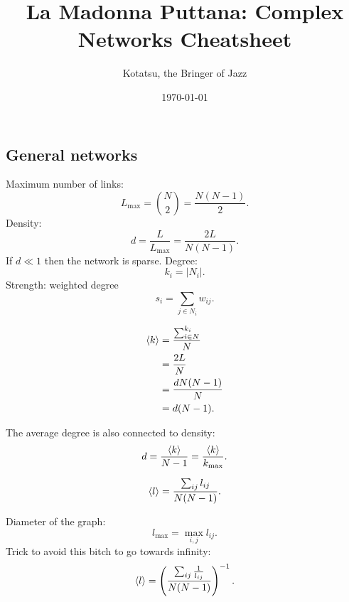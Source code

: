 \documentclass[a4paper,9pt]{extarticle}
\title{La Madonna Puttana: Complex Networks Cheatsheet}
\author{\usym{1F3BC}\;Kotatsu, the Bringer of Jazz\;\usym{1F3B9}}
\date{\today}
\begin{document}
	
	\maketitle
	
	\begin{multicols*}{2}
	\section{General networks}
	Maximum number of links:
	\begin{equation*}
		L_{\max}={N\choose2}=\frac{N(N-1)}{2}.
	\end{equation*}
	Density:
	\begin{equation*}
		d=\frac{L}{L_{\max}}=\frac{2L}{N(N-1)}.
	\end{equation*}
	If $d\ll 1$ then the network is sparse.
	Degree:
	\begin{equation*}
		k_{i}=|N_{i}|.
	\end{equation*}
	Strength: weighted degree
	\begin{equation*}
		s_{i}=\sum_{j\in N_{i}}w_{ij}.
	\end{equation*}
	\begin{riquadro}
		\begin{align*}
		\langle k \rangle&=\frac{\sum_{i\in N}^{k_{i}}}{N}\\
		&=\frac{2L}{N}\\
		&=\frac{dN(N-1)}{N}\\
		&=d(N-1).
	\end{align*}
	\end{riquadro}
	The average degree is also connected to density:
	\begin{equation*}
		d=\frac{\langle k \rangle}{N-1}=\frac{\langle k \rangle}{k_{\max}}.
	\end{equation*}
	\begin{riquadro}
		\begin{equation*}
		\langle l \rangle=\frac{\sum_{ij}l_{ij}}{N(N-1)}.
	\end{equation*}
	\end{riquadro}
	Diameter of the graph:
	\begin{equation*}
		l_{\max}=\max_{i,j}l_{ij}.
	\end{equation*}
	Trick to avoid this bitch to go towards infinity:
	\begin{equation*}
		\langle l \rangle=\left(\frac{\sum_{ij}\frac{1}{l_{ij}}}{N(N-1)}\right)^{-1}.
	\end{equation*}
	\begin{riquadro}

\end{riquadro}
\end{multicols*}
\end{document}
